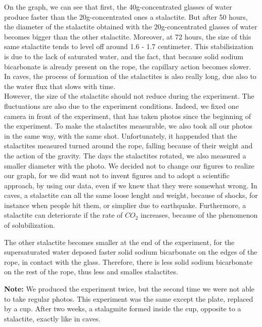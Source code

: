 \documentclass[draft, final]{report}
\begin{document}
On the graph, we can see that first, the 40g-concentrated glasses of water produce faster than the 20g-concentrated ones a stalactite. But after 50 hours, the diameter of the stalactite obtained with the 20g-concentrated glasses of water becomes bigger than the other stalactite. Moreover, at 72 hours, the size of this same stalactite tends to level off around 1.6 - 1.7 centimeter. This stabilisization is due to the lack of saturated water, and the fact, that because solid sodium bicarbonate is already present on the rope, the capillary action becomes slower. In caves, the process of formation of the stalactites is also really long, due also to the water flux that slows with time.\\
\indent However, the size of the stalactite should not reduce during the experiment. The fluctuations are also due to the experiment conditions. Indeed, we fixed one camera in front of the experiment, that has taken photos since the beginning of the experiment. To make the stalactites measurable, we also took all our photos in the same way, with the same shot. Unfortunately, it happended that the stalactites measured turned around the rope, falling because of their weight and the action of the gravity. The days the stalactites rotated, we also measured a smaller diameter with the photo. We decided not to change our figures to realize our graph, for we did want not to invent figures and to adopt a scientific approach, by using our data, even if we knew that they were somewhat wrong.
In caves, a stalactite can all the same loose lenght and weight, because of shocks, for instance when people hit them, or simplier due to earthquake. Furthermore, a stalactite can deteriorate if the rate of $CO_{2}$ increases, because of the phenomenon of solubilization.\\
\par
The other stalactite becomes smaller at the end of the experiment, for the supersaturated water deposed faster solid sodium bicarbonate on the edges of the rope, in contact with the glass. Therefore, there is less solid sodium bicarbonate on the rest of the rope, thus less and smalles stalactites.\\
\par
\textbf{Note:} We produced the experiment twice, but the second time we were not able to take regular photos. This experiment was the same except the plate, replaced by a cup. After two weeks, a stalagmite formed inside the cup, opposite to a stalactite, exactly like in caves.\\
\newpage
\end{document}
